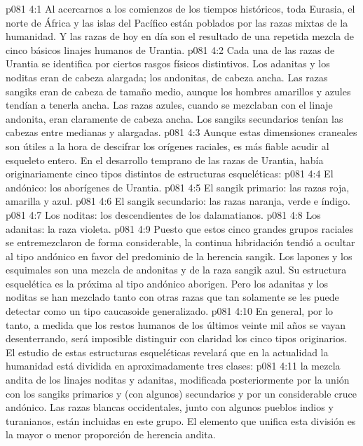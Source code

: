 \vs p081 4:1 Al acercarnos a los comienzos de los tiempos históricos, toda Eurasia, el norte de África y las islas del Pacífico están poblados por las razas mixtas de la humanidad. Y las razas de hoy en día son el resultado de una repetida mezcla de cinco básicos linajes humanos de Urantia.
\vs p081 4:2 Cada una de las razas de Urantia se identifica por ciertos rasgos físicos distintivos. Los adanitas y los noditas eran de cabeza alargada; los andonitas, de cabeza ancha. Las razas sangiks eran de cabeza de tamaño medio, aunque los hombres amarillos y azules tendían a tenerla ancha. Las razas azules, cuando se mezclaban con el linaje andonita, eran claramente de cabeza ancha. Los sangiks secundarios tenían las cabezas entre medianas y alargadas.
\vs p081 4:3 Aunque estas dimensiones craneales son útiles a la hora de descifrar los orígenes raciales, es más fiable acudir al esqueleto entero. En el desarrollo temprano de las razas de Urantia, había originariamente cinco tipos distintos de estructuras esqueléticas:
\vs p081 4:4 El andónico: los aborígenes de Urantia.
\vs p081 4:5 El sangik primario: las razas roja, amarilla y azul.
\vs p081 4:6 El sangik secundario: las razas naranja, verde e índigo.
\vs p081 4:7 Los noditas: los descendientes de los dalamatianos.
\vs p081 4:8 Los adanitas: la raza violeta.
\vs p081 4:9 \pc Puesto que estos cinco grandes grupos raciales se entremezclaron de forma considerable, la continua hibridación tendió a ocultar al tipo andónico en favor del predominio de la herencia sangik. Los lapones y los esquimales son una mezcla de andonitas y de la raza sangik azul. Su estructura esquelética es la próxima al tipo andónico aborigen. Pero los adanitas y los noditas se han mezclado tanto con otras razas que tan solamente se les puede detectar como un tipo caucasoide generalizado.
\vs p081 4:10 En general, por lo tanto, a medida que los restos humanos de los últimos veinte mil años se vayan desenterrando, será imposible distinguir con claridad los cinco tipos originarios. El estudio de estas estructuras esqueléticas revelará que en la actualidad la humanidad está dividida en aproximadamente tres clases:
\vs p081 4:11  la mezcla andita de los linajes noditas y adanitas, modificada posteriormente por la unión con los sangiks primarios y (con algunos) secundarios y por un considerable cruce andónico. Las razas blancas occidentales, junto con algunos pueblos indios y turanianos, están incluidas en este grupo. El elemento que unifica esta división es la mayor o menor proporción de herencia andita.
